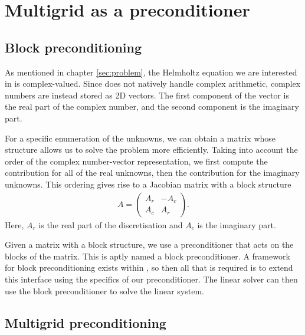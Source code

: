 
\section{Multigrid as a preconditioner}
\label{sec:precond}

\subsection{Block preconditioning}


As mentioned in chapter \ref{sec:problem}, the Helmholtz equation we are interested in is complex-valued.
Since \oomph does not natively handle complex arithmetic, complex numbers are instead stored as 2D vectors.
The first component of the vector is the real part of the complex number, and the second component is the imaginary part.

For a specific enumeration of the unknowns, we can obtain a matrix whose structure allows us to solve the problem more efficiently.
Taking into account the order of the \oomph complex number-vector representation, we first compute the contribution for all of the real unknowns, then the contribution for the imaginary unknowns.
This ordering gives rise to a Jacobian matrix with a block structure
\begin{align}
	A = \begin{pmatrix}
		A_r & -A_c \\ A_c & A_r
	\end{pmatrix}.
\end{align}
Here, $A_r$ is the real part of the discretisation and $A_c$ is the imaginary part.

Given a matrix with a block structure, we use a preconditioner that acts on the blocks of the matrix.
This is aptly named a block preconditioner.
A framework for block preconditioning exists within \oomph, so then all that is required is to extend this interface using the specifics of our preconditioner.
The linear solver can then use the block preconditioner to solve the linear system.


\subsection{Multigrid preconditioning}

